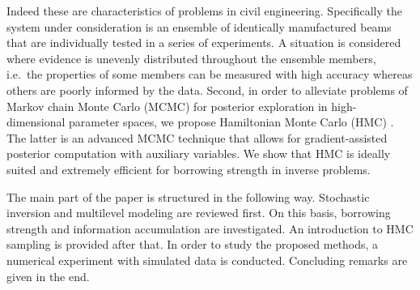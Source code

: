 Indeed these are characteristics of problems in civil engineering.
Specifically the system under consideration is an ensemble of identically manufactured beams that are individually tested in a series of experiments.
A situation is considered where evidence is unevenly distributed throughout the ensemble members,
i.e.\ the properties of some members can be measured with high accuracy whereas others are poorly informed by the data.
Second, in order to alleviate problems of Markov chain Monte Carlo (MCMC) \cite{MCMC:Robert2004,MCMC:Brooks2011} for posterior exploration in high-dimensional parameter spaces, we propose Hamiltonian Monte Carlo (HMC) \cite{MCMC:Duane1987}.
The latter is an advanced MCMC technique that allows for gradient-assisted posterior computation with auxiliary variables.
We show that HMC is ideally suited and extremely efficient for borrowing strength in inverse problems.
\par %
The main part of the paper is structured in the following way.
Stochastic inversion and multilevel modeling are reviewed first.
On this basis, borrowing strength and information accumulation are investigated.
An introduction to HMC sampling is provided after that.
In order to study the proposed methods, a numerical experiment with simulated data is conducted.
Concluding remarks are given in the end.